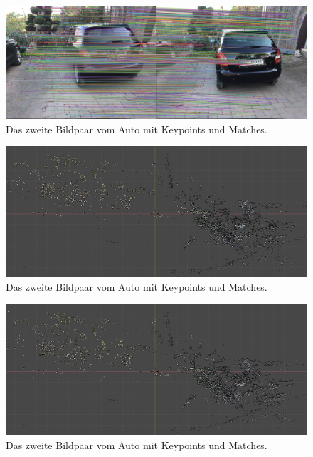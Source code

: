 \begin{figure}
    \includegraphics[width=\textwidth]{src/img/car_second_pair_with_matches.jpg}
    \caption{Das zweite Bildpaar vom Auto mit Keypoints und Matches.}
    \label{fig:car-second-pair-with-matches}
\end{figure}

\begin{figure}
    \includegraphics[width=\textwidth]{src/img/car_model.jpg}
    \caption{Das zweite Bildpaar vom Auto mit Keypoints und Matches.}
    \label{fig:car-model}
\end{figure}

\begin{figure}
    \includegraphics[width=\textwidth]{src/img/car_model.jpg}
    \caption{Das zweite Bildpaar vom Auto mit Keypoints und Matches.}
    \label{fig:car-model-2}
\end{figure}
